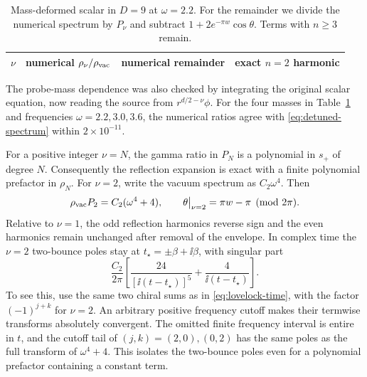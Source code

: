 \begin{table}[t]
 \centering\small
 \begin{tabular}{cccc}
 \hline
 \(\nu\) & numerical \(\rho_\nu/\rho_{\rm vac}\) &
 numerical remainder & exact \(n=2\) harmonic \\
 \hline
 
 \end{tabular}
 \caption{Mass-deformed scalar in \(D=9\) at \(\omega=2.2\).
 For the remainder we divide the numerical spectrum by \(P_\nu\) and
 subtract \(1+2e^{-\pi w}\cos\theta\). Terms with \(n\geq3\) remain.}
 \label{tab:detuned}
\end{table}

The probe-mass dependence was also checked by integrating the original
scalar equation, now reading the source from \(r^{d/2-\nu}\phi\).
For the four masses in Table~\ref{tab:detuned} and frequencies
\(\omega=2.2,3.0,3.6\), the numerical ratios agree with
\eqref{eq:detuned-spectrum} within \(2\times10^{-11}\).

For a positive integer \(\nu=N\), the gamma ratio in \(P_N\) is a polynomial in \(s_+\) of degree \(N\). Consequently the reflection expansion is exact with a finite polynomial prefactor in \(\rho_N\). For \(\nu=2\), write the vacuum spectrum as \(C_2\omega^4\). Then
\begin{equation}
 \rho_{\rm vac} P_2=C_2(\omega^4+4),\qquad
 \theta\big|_{\nu=2}=\pi w-\pi \pmod{2\pi}.
\end{equation}
Relative to \(\nu=1\), the odd reflection harmonics reverse sign and the even harmonics remain unchanged after removal of the envelope. In complex time the \(\nu=2\) two-bounce poles stay at \(t_\star=\pm\beta+\ii\beta\), with singular part
\begin{equation}
 \frac{C_2}{2\pi}
 \left[\frac{24}{[\ii(t-t_\star)]^5}
           +\frac{4}{\ii(t-t_\star)}\right].
 \label{eq:detuned-pole}
\end{equation}
To see this, use the same two chiral sums as in \eqref{eq:lovelock-time}, with the factor \((-1)^{j+k}\) for \(\nu=2\). An arbitrary positive frequency cutoff makes their termwise transforms absolutely convergent. The omitted finite frequency interval is entire in \(t\), and the cutoff tail of \((j,k)=(2,0),(0,2)\) has the same poles as the full transform of \(\omega^4+4\). This isolates the two-bounce poles even for a polynomial prefactor containing a constant term.
